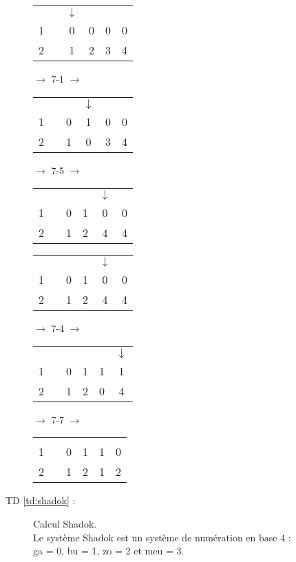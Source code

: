 \begin{description}
	\noindent\begin{tabular}{|cccccc|}
	\hline
	  &                 & $\downarrow$ & & & \\
	1 & \makebox[1mm]{} & 0 & 0 & 0 & 0 \\
	\hline
	2 & & 1 & 2 & 3 & 4 \\
	\hline
	\end{tabular}
	$\rightarrow$ 7-1 $\rightarrow$ 
	\begin{tabular}{|cccccc|}
	\hline
	  &                 & & $\downarrow$ & & \\
	1 & \makebox[1mm]{} & 0 & 1 & 0 & 0 \\
	\hline
	2 & & 1 & 0 & 3 & 4\\
	\hline
	\end{tabular}
	$\rightarrow$ 7-5 $\rightarrow$ 
	\begin{tabular}{|cccccc|}
	\hline
	  &                 & & & $\downarrow$ & \\
	1 & \makebox[1mm]{} & 0 & 1 & 0 & 0 \\
	\hline
	2 & & 1 & 2 & 4 & 4\\
	\hline
	\end{tabular}
	
	\noindent\begin{tabular}{|cccccc|}
	\hline
	  &                 & & & $\downarrow$ & \\
	1 & \makebox[1mm]{} & 0 & 1 & 0 & 0 \\
	\hline
	2 & & 1 & 2 & 4 & 4\\
	\hline
	\end{tabular}
	$\rightarrow$ 7-4 $\rightarrow$ 
	\begin{tabular}{|cccccc|}
	\hline
	  &                 & & & & $\downarrow$ \\
	1 & \makebox[1mm]{} & 0 & 1 & 1 & 1 \\
	\hline
	2 & & 1 & 2 & 0 & 4\\
	\hline
	\end{tabular}
	$\rightarrow$ 7-7 $\rightarrow$ 
	\begin{tabular}{|cccccc|}
	\hline
	  &                 & & & & \\
	1 & \makebox[1mm]{} & 0 & 1 & 1 & 0 \\
	\hline
	2 & & 1 & 2 & 1 & 2\\
	\hline
	\end{tabular}
\item[TD \ref{td:shadok} :] Calcul Shadok.\\
	Le système Shadok est un système de numération en base 4 :\\
	{\sc ga} = 0, {\sc bu} = 1, {\sc zo} = 2 et {\sc meu} = 3.
\end{description}
